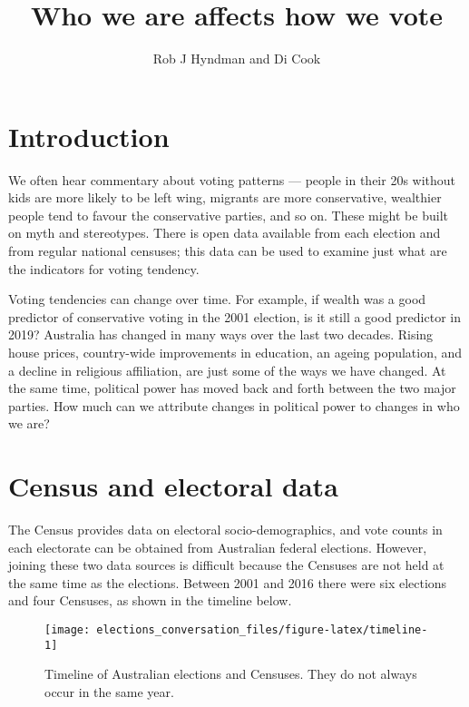 \documentclass[11pt,a4paper,]{article}
\title{Who we are affects how we vote}
\author{Rob J Hyndman and Di Cook}
\date{}
\begin{document}
\maketitle

\hypertarget{intro}{%
\section{Introduction}\label{intro}}

We often hear commentary about voting patterns --- people in their 20s without kids are more likely to be left wing, migrants are more conservative, wealthier people tend to favour the conservative parties, and so on. These might be built on myth and stereotypes. There is open data available from each election and from regular national censuses; this data can be used to examine just what are the indicators for voting tendency.

Voting tendencies can change over time. For example, if wealth was a good predictor of conservative voting in the 2001 election, is it still a good predictor in 2019? Australia has changed in many ways over the last two decades. Rising house prices, country-wide improvements in education, an ageing population, and a decline in religious affiliation, are just some of the ways we have changed. At the same time, political power has moved back and forth between the two major parties. How much can we attribute changes in political power to changes in who we are?

\hypertarget{census-and-electoral-data}{%
\section{Census and electoral data}\label{census-and-electoral-data}}

The Census provides data on electoral socio-demographics, and vote counts in each electorate can be obtained from Australian federal elections. However, joining these two data sources is difficult because the Censuses are not held at the same time as the elections. Between 2001 and 2016 there were six elections and four Censuses, as shown in the timeline below.

\begin{figure}[H]

{\centering \texttt{[image: elections\_conversation\_files/figure-latex/timeline-1]} 

}

\caption{Timeline of Australian elections and Censuses. They do not always occur in the same year.}\label{fig:timeline}
\end{figure}
\end{document}
